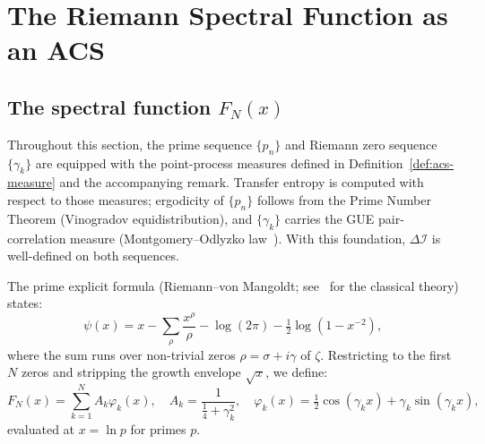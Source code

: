 \documentclass[12pt,a4paper]{article}
\theoremstyle{plain}
\theoremstyle{definition}
\theoremstyle{remark}
\newcommand{\DI}{\Delta\mathcal{I}}
\begin{document}
\section{The Riemann Spectral Function as an ACS}
\label{sec:riemann}

\subsection{The spectral function \texorpdfstring{$F_N(x)$}{F\_N(x)}}

Throughout this section, the prime sequence $\{p_n\}$ and Riemann zero sequence $\{\gamma_k\}$ are equipped with the point-process measures defined in Definition~\ref{def:acs-measure} and the accompanying remark.  Transfer entropy is computed with respect to those measures; ergodicity of $\{p_n\}$ follows from the Prime Number Theorem (Vinogradov equidistribution), and $\{\gamma_k\}$ carries the GUE pair-correlation measure (Montgomery--Odlyzko law~\cite{Montgomery1973,Odlyzko1987}).  With this foundation, $\DI$ is well-defined on both sequences.

The prime explicit formula (Riemann--von Mangoldt; see~\cite{Davenport2000} for the classical theory) states:
\begin{equation}
  \psi(x) = x - \sum_\rho \frac{x^\rho}{\rho} - \log(2\pi) - \tfrac{1}{2}\log(1-x^{-2}),
\end{equation}
where the sum runs over non-trivial zeros $\rho = \sigma + i\gamma$ of $\zeta$.
Restricting to the first $N$ zeros and stripping the growth envelope $\sqrt{x}$, 
we define:
\begin{equation}
  F_N(x) = \sum_{k=1}^N A_k \varphi_k(x), 
  \quad A_k = \frac{1}{\tfrac{1}{4}+\gamma_k^2}, 
  \quad \varphi_k(x) = \tfrac{1}{2}\cos(\gamma_k x) + \gamma_k\sin(\gamma_k x),
\end{equation}
evaluated at $x = \ln p$ for primes $p$.
\end{document}
